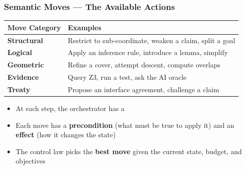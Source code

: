 \begin{frame}
\frametitle{Semantic Moves --- The Available Actions}
\begin{center}
\small
\begin{tabular}{@{} l l @{}}
  \toprule
  \textbf{Move Category} & \textbf{Examples} \\
  \midrule
  \textcolor{jugeoBlue}{\textbf{Structural}}
    & Restrict to sub-coordinate, weaken a claim, split a goal \\
  \textcolor{jugeoGreen}{\textbf{Logical}}
    & Apply an inference rule, introduce a lemma, simplify \\
  \textcolor{jugeoOrange}{\textbf{Geometric}}
    & Refine a cover, attempt descent, compute overlaps \\
  \textcolor{jugeoRed}{\textbf{Evidence}}
    & Query Z3, run a test, ask the AI oracle \\
  \textcolor{jugeoDark}{\textbf{Treaty}}
    & Propose an interface agreement, challenge a claim \\
  \bottomrule
\end{tabular}
\end{center}
\vfill
\begin{itemize}
  \item At each step, the orchestrator has a 
  \item Each move has a \textbf{precondition} (what must be true to apply it)
        and an \textbf{effect} (how it changes the state)
  \item The control law picks the \textbf{best move} given the current state,
        budget, and objectives
\end{itemize}
\end{frame}

